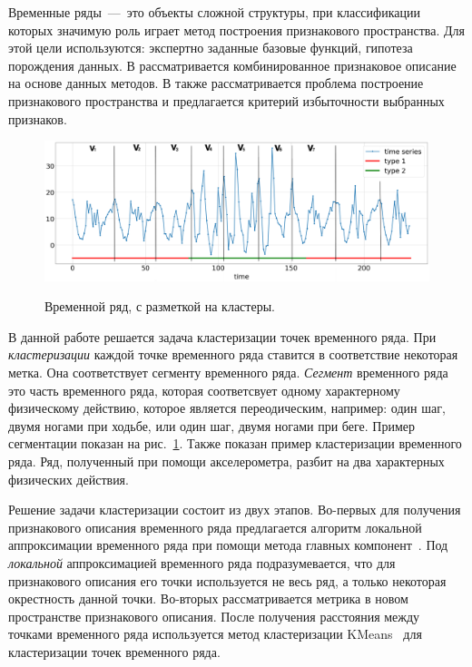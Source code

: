 \documentclass[12pt, twoside]{article}
\numberwithin{equation}{section}
\begin{document}
Временные ряды~---~это объекты сложной структуры, при классификации которых значимую роль играет метод построения признакового пространства. Для этой цели используются: экспертно заданные базовые функций, гипотеза порождения данных. В \cite{Ivkin2015} рассматривается комбинированное признаковое описание на основе данных методов. В \cite{Katrutsa2015} также рассматривается проблема построение признакового пространства и предлагается критерий избыточности выбранных признаков.
\begin{figure}[h!t]\center
\includegraphics[width=1\textwidth]{results/example}\\
\caption{Временной ряд, с разметкой на кластеры.}
\label{example_1}
\end{figure}

В данной работе решается задача кластеризации точек временного ряда. При \textit{кластеризации} каждой точке временного ряда ставится в соответствие некоторая метка. Она соответствует сегменту временного ряда. \textit{Сегмент} временного ряда это часть временного ряда, которая соответсвует одному характерному физическому действию, которое является переодическим, например: один шаг, двумя ногами при ходьбе, или один шаг, двумя ногами при беге. Пример сегментации показан на  рис.~\ref{example_1}. Также показан пример кластеризации временного ряда. Ряд, полученный при помощи акселерометра, разбит на два характерных физических действия.

Решение задачи кластеризации состоит из двух этапов. Во-первых для получения признакового описания временного ряда предлагается алгоритм локальной аппроксимации временного ряда при помощи метода главных компонент~\cite{Shiglavsi1997}. Под \textit{локальной} аппроксимацией временного ряда подразумевается, что для признакового описания его точки используется не весь ряд, а только некоторая окрестность данной точки. Во-вторых рассматривается метрика в новом пространстве признакового описания. После получения расстояния между точками временного ряда используется метод кластеризации KMeans~\cite{Kanungo2000} для кластеризации точек временного ряда.
\end{document}
